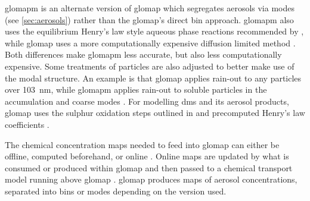 		\gls{glomapm} is an alternate version of \gls{glomap} which segregates aerosols via modes (see \cref{sec:aerosols}) rather than the \gls{glomap}'s direct bin approach. \gls{glomapm} also uses the equilibrium Henry's law style aqueous phase reactions recommended by \citet{barnes:2006ug}, while \gls{glomap} uses a more computationally expensive diffusion limited method \citep{mann:2010wb}. Both differences make \gls{glomapm} less accurate, but also less computationally expensive. Some treatments of particles are also adjusted to better make use of the modal structure. An example is that \gls{glomap} applies rain-out to any particles over \SI{103}{\nm}, while \gls{glomapm} applies rain-out to soluble particles in the accumulation and coarse modes \citep{mann:2010wb}. For modelling \gls{dms} and its aerosol products, \gls{glomap} uses the sulphur oxidation steps outlined in \citet{seinfeld2012atmospheric} and precomputed Henry's law coefficients \citep{mann:2010wb}. 


		The chemical concentration maps needed to feed into \gls{glomap} can either be offline, computed beforehand, or online \citep{mann:2010wb}. Online maps are updated by what is consumed or produced within \gls{glomap} and then passed to a chemical transport model running above \gls{glomap} \citep{spracklen2003development}. \gls{glomap} produces maps of aerosol concentrations, separated into bins or modes depending on the version used.


